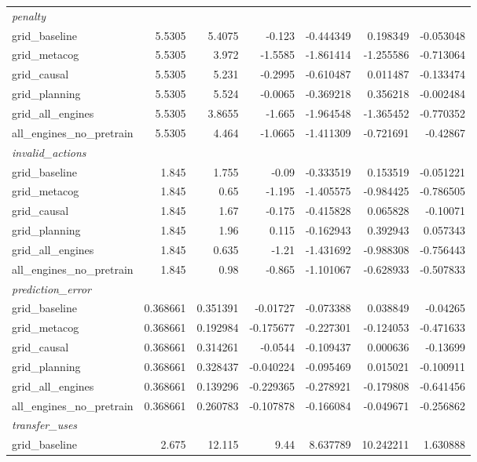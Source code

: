 \begin{tabular}{lrrrrrr}
  \multicolumn{7}{l}{\textit{penalty}} \\
  grid_baseline & 5.5305 & 5.4075 & -0.123 & -0.444349 & 0.198349 & -0.053048 \\
  grid_metacog & 5.5305 & 3.972 & -1.5585 & -1.861414 & -1.255586 & -0.713064 \\
  grid_causal & 5.5305 & 5.231 & -0.2995 & -0.610487 & 0.011487 & -0.133474 \\
  grid_planning & 5.5305 & 5.524 & -0.0065 & -0.369218 & 0.356218 & -0.002484 \\
  grid_all_engines & 5.5305 & 3.8655 & -1.665 & -1.964548 & -1.365452 & -0.770352 \\
  all_engines_no_pretrain & 5.5305 & 4.464 & -1.0665 & -1.411309 & -0.721691 & -0.42867 \\
  \multicolumn{7}{l}{\textit{invalid_actions}} \\
  grid_baseline & 1.845 & 1.755 & -0.09 & -0.333519 & 0.153519 & -0.051221 \\
  grid_metacog & 1.845 & 0.65 & -1.195 & -1.405575 & -0.984425 & -0.786505 \\
  grid_causal & 1.845 & 1.67 & -0.175 & -0.415828 & 0.065828 & -0.10071 \\
  grid_planning & 1.845 & 1.96 & 0.115 & -0.162943 & 0.392943 & 0.057343 \\
  grid_all_engines & 1.845 & 0.635 & -1.21 & -1.431692 & -0.988308 & -0.756443 \\
  all_engines_no_pretrain & 1.845 & 0.98 & -0.865 & -1.101067 & -0.628933 & -0.507833 \\
  \multicolumn{7}{l}{\textit{prediction_error}} \\
  grid_baseline & 0.368661 & 0.351391 & -0.01727 & -0.073388 & 0.038849 & -0.04265 \\
  grid_metacog & 0.368661 & 0.192984 & -0.175677 & -0.227301 & -0.124053 & -0.471633 \\
  grid_causal & 0.368661 & 0.314261 & -0.0544 & -0.109437 & 0.000636 & -0.13699 \\
  grid_planning & 0.368661 & 0.328437 & -0.040224 & -0.095469 & 0.015021 & -0.100911 \\
  grid_all_engines & 0.368661 & 0.139296 & -0.229365 & -0.278921 & -0.179808 & -0.641456 \\
  all_engines_no_pretrain & 0.368661 & 0.260783 & -0.107878 & -0.166084 & -0.049671 & -0.256862 \\
  \multicolumn{7}{l}{\textit{transfer_uses}} \\
  grid_baseline & 2.675 & 12.115 & 9.44 & 8.637789 & 10.242211 & 1.630888 \\

\end{tabular}
